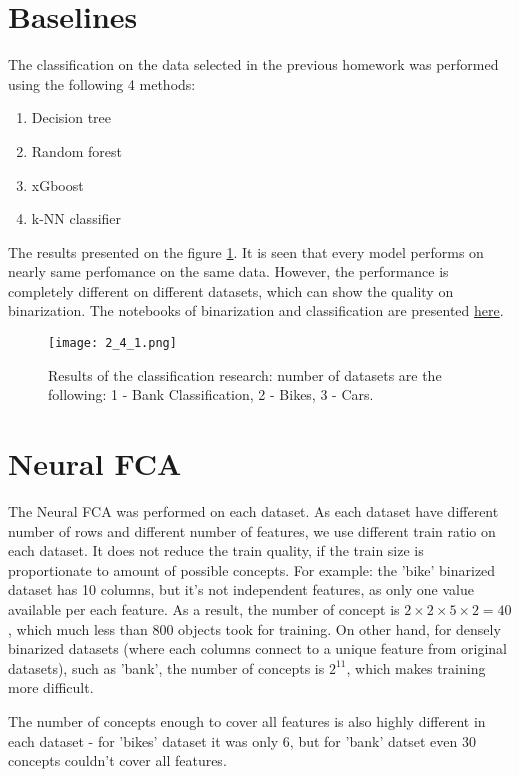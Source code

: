 \section{Baselines}

The classification on the data selected in the previous homework was performed using the following 4 methods:

\begin{enumerate}
\item Decision tree
\item Random forest
\item xGboost
\item k-NN classifier
\end{enumerate}

The results presented on the figure \ref{fig:baseline}. 
It is seen that every model performs on nearly same perfomance on the same data.
However, the performance is completely different on different datasets, which can show the quality on binarization.
The notebooks of binarization and classification are presented \href{https:/github.com/Chpel/Maga/tree/main/OSDA\%20.ipynb/Big\%20homework}{here}.

\begin{figure}[h]
\centering
\texttt{[image: 2\_4\_1.png]}
\caption{Results of the classification research: number of datasets are the following: 1 - Bank Classification, 2 - Bikes, 3 - Cars.}
\label{fig:baseline}
\end{figure}

\section{Neural FCA}

The Neural FCA was performed on each dataset. 
As each dataset have different number of rows and different number of features, we use different train ratio on each dataset.
It does not reduce the train quality, if the train size is proportionate to amount of possible concepts. 
For example: the 'bike' binarized dataset has 10 columns, but it's not independent features, as only one value available per each feature.
As a result, the number of concept is $2 \times 2 \times 5 \times 2 = 40$, which much less than 800 objects took for training.
On other hand, for densely binarized datasets (where each columns connect to a unique feature from original datasets), such as 'bank', the number of concepts is $2^11$, which makes training more difficult.

The number of concepts enough to cover all features is also highly different in each dataset - for 'bikes' dataset it was only 6, but for 'bank' datset even 30 concepts couldn't cover all features.

